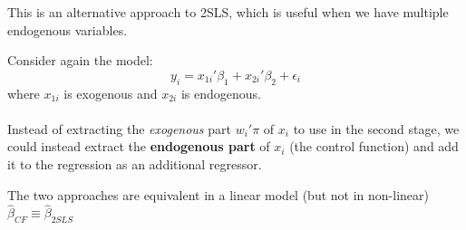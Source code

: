 \documentclass[DIV=14,titlepage=false]{scrreprt}
\begin{document}
This is an alternative approach to 2SLS, which is useful when we have multiple endogenous variables.

Consider again the model:
\[y_i=x_{1i}'\beta_1+x_{2i}'\beta_2+\epsilon_i\]
where \(x_{1i}\) is exogenous and \(x_{2i}\) is endogenous.
\\ \\ Instead of extracting the \textit{exogenous} part \(w_i'\pi\) of \(x_i\) to use in the second stage, we could instead extract the \textbf{endogenous part} of \(x_i\) (the control function) and add it to the regression as an additional regressor.
\vspace{5mm}
\begin{theorem}
The two approaches are equivalent in a linear model (but not in non-linear) \(\hat\beta_{CF}\equiv\hat\beta_{2SLS}\)
\end{theorem}
\vspace{5mm}
\end{document}
